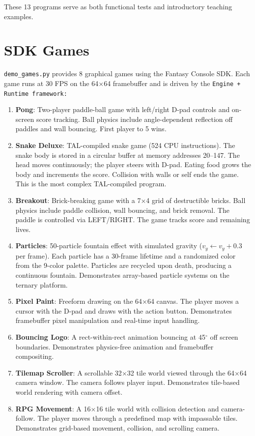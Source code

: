 \documentclass[10pt,a4paper,twoside]{book}
\begin{document}
These 13 programs serve as both functional tests and introductory teaching examples.

\section{SDK Games}

\texttt{demo\_games.py} provides 8 graphical games using the Fantasy Console SDK.
Each game runs at 30 FPS on the 64$\times$64 framebuffer and is driven by the
\tt{Engine} + \tt{Runtime} framework:

\begin{enumerate}
    \item \textbf{Pong}: Two-player paddle-ball game with left/right D-pad controls
          and on-screen score tracking. Ball physics include angle-dependent reflection
          off paddles and wall bouncing. First player to 5 wins.
    \item \textbf{Snake Deluxe}: TAL-compiled snake game (524 CPU instructions). The
          snake body is stored in a circular buffer at memory addresses 20--147.
          The head moves continuously; the player steers with D-pad. Eating food
          grows the body and increments the score. Collision with walls or self
          ends the game. This is the most complex TAL-compiled program.
    \item \textbf{Breakout}: Brick-breaking game with a 7$\times$4 grid of destructible
          bricks. Ball physics include paddle collision, wall bouncing, and brick
          removal. The paddle is controlled via LEFT/RIGHT. The game tracks score
          and remaining lives.
    \item \textbf{Particles}: 50-particle fountain effect with simulated gravity
          ($v_y \gets v_y + 0.3$ per frame). Each particle has a 30-frame lifetime
          and a randomized color from the 9-color palette. Particles are recycled
          upon death, producing a continuous fountain. Demonstrates array-based
          particle systems on the ternary platform.
    \item \textbf{Pixel Paint}: Freeform drawing on the 64$\times$64 canvas. The
          player moves a cursor with the D-pad and draws with the action button.
          Demonstrates framebuffer pixel manipulation and real-time input handling.
    \item \textbf{Bouncing Logo}: A rect-within-rect animation bouncing at 45$^\circ$
          off screen boundaries. Demonstrates physics-free animation and framebuffer
          compositing.
    \item \textbf{Tilemap Scroller}: A scrollable 32$\times$32 tile world viewed
          through the 64$\times$64 camera window. The camera follows player input.
          Demonstrates tile-based world rendering with camera offset.
    \item \textbf{RPG Movement}: A 16$\times$16 tile world with collision detection
          and camera-follow. The player moves through a predefined map with
          impassable tiles. Demonstrates grid-based movement, collision, and
          scrolling camera.
\end{enumerate}
\end{document}
